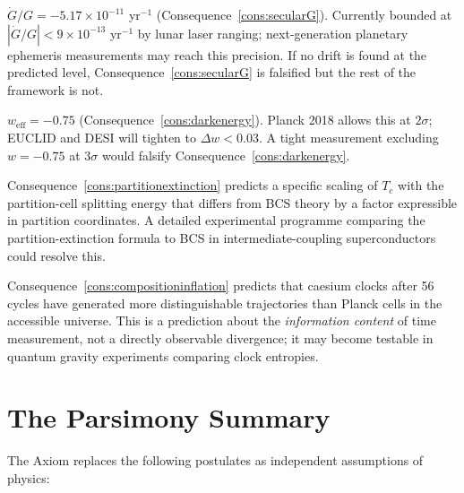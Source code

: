 \begin{description}[leftmargin=0pt, itemsep=4pt]
  \item[Secular drift of $G$.]
    $\dot{G}/G = -5.17\times 10^{-11}$ yr$^{-1}$
    (Consequence~\ref{cons:secularG}).
    Currently bounded at $|\dot{G}/G|<9\times 10^{-13}$ yr$^{-1}$ by
    lunar laser ranging; next-generation planetary ephemeris measurements
    may reach this precision.  If no drift is found at the predicted level,
    Consequence~\ref{cons:secularG} is falsified but the rest of the
    framework is not.

  \item[Dark-energy equation of state.]
    $w_{\text{eff}}=-0.75$ (Consequence~\ref{cons:darkenergy}).
    Planck 2018 allows this at $2\sigma$; EUCLID and DESI will tighten to
    $\Delta w<0.03$.  A tight measurement excluding $w=-0.75$ at
    $3\sigma$ would falsify Consequence~\ref{cons:darkenergy}.

  \item[Partition-extinction $T_c$ scaling.]
    Consequence~\ref{cons:partitionextinction} predicts a specific scaling
    of $T_c$ with the partition-cell splitting energy that differs from BCS
    theory by a factor expressible in partition coordinates.  A detailed
    experimental programme comparing the partition-extinction formula to BCS
    in intermediate-coupling superconductors could resolve this.

  \item[Trans-Planckian categorical resolution.]
    Consequence~\ref{cons:compositioninflation} predicts that caesium
    clocks after 56 cycles have generated more distinguishable trajectories
    than Planck cells in the accessible universe.  This is a prediction about
    the \emph{information content} of time measurement, not a directly
    observable divergence; it may become testable in quantum gravity
    experiments comparing clock entropies.
\end{description}

\section*{The Parsimony Summary}

The Axiom replaces the following postulates as independent assumptions of
physics:

